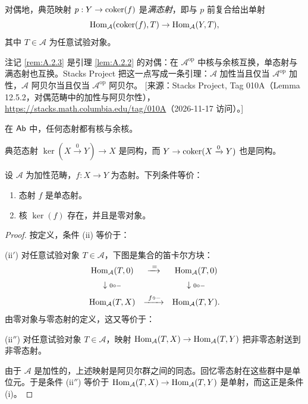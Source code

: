 \begin{remark}\label{rem:A.2.3}
对偶地，典范映射 $p:Y\to\operatorname{coker}(f)$ 是\emph{满态射}，即与 $p$ 前复合给出单射
\[
\operatorname{Hom}_{\mathcal{A}}(\operatorname{coker}(f),T)\to\operatorname{Hom}_{\mathcal{A}}(Y,T),
\]
其中 $T\in\mathcal{A}$ 为任意试验对象。
\end{remark}

\begin{yizhu}
注记 \ref{rem:A.2.3} 是引理 \ref{lem:A.2.2} 的对偶：在 $\mathcal{A}^{\mathrm{op}}$ 中核与余核互换，单态射与满态射也互换。Stacks Project 把这一点写成一条引理：$\mathcal{A}$ 加性当且仅当 $\mathcal{A}^{\mathrm{op}}$ 加性，$\mathcal{A}$ 阿贝尔当且仅当 $\mathcal{A}^{\mathrm{op}}$ 阿贝尔。
[来源：Stacks Project, Tag 010A（Lemma 12.5.2，对偶范畴中的加性与阿贝尔性），\url{https://stacks.math.columbia.edu/tag/010A}（2026-11-17 访问）。]
\end{yizhu}

\begin{example}\label{ex:A.2.4}
在 $\mathsf{Ab}$ 中，任何态射都有核与余核。
\end{example}

\begin{example}\label{ex:A.2.5}
典范态射 $\ker(X\xrightarrow{0}Y)\to X$ 是同构，而 $Y\to\operatorname{coker}(X\xrightarrow{0}Y)$ 也是同构。
\end{example}

\begin{lemma}\label{lem:A.2.6}
设 $\mathcal{A}$ 为加性范畴，$f:X\to Y$ 为态射。下列条件等价：
\begin{enumerate}[label=(\roman*),leftmargin=2em,itemsep=0.25ex]
  \item 态射 $f$ 是单态射。
  \item 核 $\ker(f)$ 存在，并且是零对象。
\end{enumerate}
\end{lemma}

\begin{proof}
按定义，条件 (ii) 等价于：

(ii$'$) 对任意试验对象 $T\in\mathcal{A}$，下图是集合的笛卡尔方块：
\[
\begin{array}{ccc}
\operatorname{Hom}_{\mathcal{A}}(T,0) & \xrightarrow{\ =} & \operatorname{Hom}_{\mathcal{A}}(T,0)\\[1.2ex]
\downarrow{\scriptstyle 0\circ -} & & \downarrow{\scriptstyle 0\circ -}\\[1.2ex]
\operatorname{Hom}_{\mathcal{A}}(T,X) & \xrightarrow{\ f\circ -} & \operatorname{Hom}_{\mathcal{A}}(T,Y).
\end{array}
\]
由零对象与零态射的定义，这又等价于：

(ii$''$) 对任意试验对象 $T\in\mathcal{A}$，映射 $\operatorname{Hom}_{\mathcal{A}}(T,X)\to\operatorname{Hom}_{\mathcal{A}}(T,Y)$ 把非零态射送到非零态射。

由于 $\mathcal{A}$ 是加性的，上述映射是阿贝尔群之间的同态。回忆零态射在这些群中是单位元。于是条件 (ii$''$) 等价于 $\operatorname{Hom}_{\mathcal{A}}(T,X)\to\operatorname{Hom}_{\mathcal{A}}(T,Y)$ 是单射，而这正是条件 (i)。
\end{proof}

